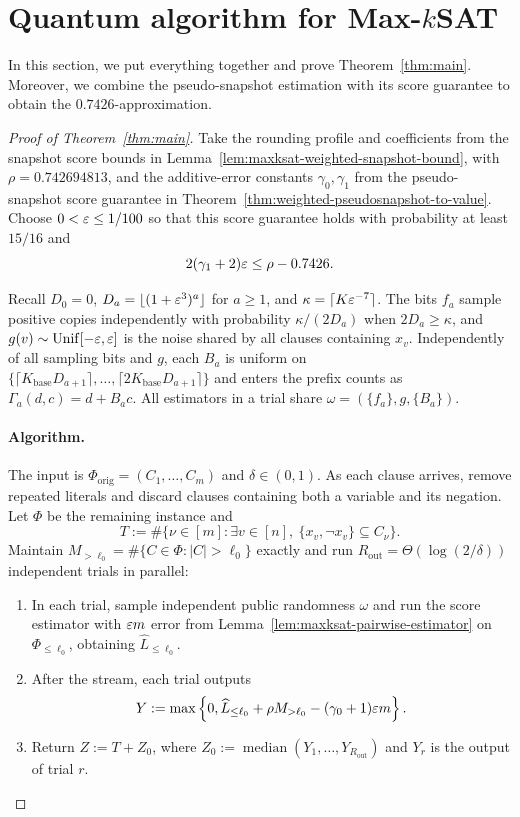 \section{Quantum algorithm for Max-\texorpdfstring{$k$}{k}SAT}
\label{subsec:maxksat-final-algorithm}
In this section, we put everything together and  prove Theorem~\ref{thm:main}. Moreover, we   combine the  pseudo-snapshot estimation with its score guarantee to obtain the $0.7426$-approximation.

\begin{proof}[Proof of Theorem~\ref{thm:main}]
Take the rounding profile and coefficients from the snapshot score bounds in Lemma~\ref{lem:maxksat-weighted-snapshot-bound}, with $\rho=0.742694813$, and the additive-error constants $\gamma_0,\gamma_1$ from the pseudo-snapshot score guarantee in Theorem~\ref{thm:weighted-pseudosnapshot-to-value}.
Choose $0<\varepsilon\le1/100$ so that this score guarantee holds with probability at least $15/16$ and
\[
  2(\gamma_1+2)\varepsilon\le\rho-0.7426.
\]

Recall $D_0=0$, $D_a=\lfloor(1+\varepsilon^3)^a\rfloor$ for $a\ge1$, and $\kappa=\lceil K\varepsilon^{-7}\rceil$.
The bits $f_a$ sample positive copies independently with probability $\kappa/(2D_a)$ when $2D_a\ge\kappa$, and $g(v)\sim\operatorname{Unif}[-\varepsilon,\varepsilon]$ is the noise shared by all clauses containing $x_v$.
Independently of all sampling bits and $g$, each $B_a$ is uniform on $\{\lceil K_{\mathrm{base}}D_{a+1}\rceil,\ldots,\lceil2K_{\mathrm{base}}D_{a+1}\rceil\}$ and enters the prefix counts as $\Gamma_a(d,c)=d+B_ac$.
All estimators in a trial share $\omega=(\{f_a\},g,\{B_a\})$.

\paragraph{Algorithm.}
The input is $\Phi_{\mathrm{orig}}=(C_1,\ldots,C_m)$ and $\delta\in(0,1)$.
As each clause arrives, remove repeated literals and discard clauses containing both a variable and its negation. Let $\Phi$ be the remaining instance and
\[
T:=\#\{\nu\in[m]:\exists v\in[n],\ \{x_v,\neg x_v\}\subseteq C_\nu\}.
\]
Maintain $M_{>\ell_0}=\#\{C\in\Phi:|C|>\ell_0\}$ exactly and run $R_{\mathrm{out}}=\Theta(\log(2/\delta))$ independent trials in parallel:
\begin{enumerate}[leftmargin=1.5em,itemsep=0.2em,topsep=0.2em]
  \item In each trial, sample independent public randomness $\omega$ and run the score estimator with $\varepsilon m$ error from Lemma~\ref{lem:maxksat-pairwise-estimator} on $\Phi_{\le\ell_0}$, obtaining $\widehat L_{\le\ell_0}$.
  \item After the stream, each trial outputs
  \[
    Y:=\max\left\{0,\widehat L_{\le\ell_0}
      +\rho M_{>\ell_0}-(\gamma_0+1)\varepsilon m\right\}.
  \]
  \item Return $Z:=T+Z_0$, where $Z_0:=\operatorname{median}(Y_1,\ldots,Y_{R_{\mathrm{out}}})$ and $Y_r$ is the output of trial $r$.
\end{enumerate}


\end{proof}
